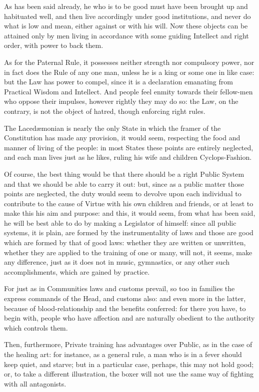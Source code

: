 As has been said already, he who is to be good must have been brought up and
habituated well, and then live accordingly under good institutions, and never
do what is low and mean, either against or with his will. Now these objects can
be attained only by men living in accordance with some guiding Intellect and
right order, with power to back them.

As for the Paternal Rule, it possesses neither strength nor compulsory power,
nor in fact does the Rule of any one man, unless he is a king or some one in
like case: but the Law has power to compel, since it is a declaration emanating
from Practical Wisdom and Intellect. And people feel enmity towards their
fellow-men who oppose their impulses, however rightly they may do so: the Law,
on the contrary, is not the object of hatred, though enforcing right rules.

The Lacedæmonian is nearly the only State in which the framer of the
Constitution has made any provision, it would seem, respecting the food and
manner of living of the people: in most States these points are entirely
neglected, and each man lives just as he likes, ruling his wife and children
Cyclops-Fashion.

Of course, the best thing would be that there should be a right Public System
and that we should be able to carry it out: but, since as a public matter those
points are neglected, the duty would seem to devolve upon each individual to
contribute to the cause of Virtue with his own children and friends, or at
least to make this his aim and purpose: and this, it would seem, from what has
been said, he will be best able to do by making a Legislator of himself: since
all public systems, it is plain, are formed by the instrumentality of laws and
those are good which are formed by that of good laws: whether they are written
or unwritten, whether they are applied to the training of one or many, will
not, it seems, make any difference, just as it does not in music, gymnastics,
or any other such accomplishments, which are gained by practice.

For just as in Communities laws and customs prevail, so too in families the
express commands of the Head, and customs also: and even more in the latter,
because of blood-relationship and the benefits conferred: for there you have,
to begin with, people who have affection and are naturally obedient to the
authority which controls them.

Then, furthermore, Private training has advantages over Public, as in the case
of the healing art: for instance, as a general rule, a man who is in a fever
should keep quiet, and starve; but in a particular case, perhaps, this may not
hold good; or, to take a different illustration, the boxer will not use the
same way of fighting with all antagonists.

